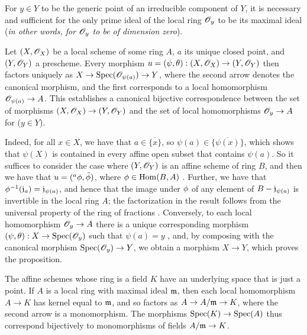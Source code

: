 \begin{cor}[2.4.3]
\label{1.2.4.3}
For $y\in Y$ to be the generic point of an irreducible component of $Y$, it is necessary and sufficient for the only prime ideal of the local ring $\mathscr{O}_y$ to be its maximal ideal (\emph{in other words, for $\mathscr{O}_y$ to be of \emph{dimension zero}}).
\end{cor}

\begin{prop}[2.4.4]
\label{1.2.4.4}
Let $(X,\mathscr{O}_X)$ be a local scheme of some ring $A$, $a$ its unique closed point, and $(Y,\mathscr{O}_Y)$ a prescheme.
Every morphism $u=(\psi,\theta):(X,\OO_X)\to(Y,\OO_Y)$ then factors uniquely as $X\to\Spec(\OO_{\psi(a)})\to Y$, where the second arrow denotes the canonical morphism, and the first corresponds to a local homomorphism $\OO_{\psi(a)}\to A$.
This establishes a canonical bijective correspondence between the set of morphisms $(X,\OO_X)\to(Y,\OO_Y)$ and the set of local homomorphisms $\OO_y\to A$ for ($y\in Y$).
\end{prop}

Indeed, for all $x\in X$, we have that $a\in\overline{\{x\}}$, so $\psi(a)\in\overline{\{\psi(x)\}}$, which shows that $\psi(X)$ is contained in every affine open subset that contains $\psi(a)$.
So it suffices to consider the case where $(Y,\mathscr{O}_Y)$ is an affine scheme of ring $B$, and then we have that $u=({}^a\phi,\tilde{\phi})$, where $\phi\in{\mathop{\mathrm{Hom}}\nolimits}(B,A)$ .
Further, we have that $\phi^{-1}(\mathfrak{j}_a)=\mathfrak{j}_{\psi(a)}$, and hence that the image under $\phi$ of any element of $B-\mathfrak{j}_{\psi(a)}$ is invertible in the local ring $A$;
the factorization in the result follows from the universal property of the ring of fractions .
Conversely, to each local homomorphism $\OO_y\to A$ there is a unique corresponding morphism $(\psi,\theta):X\to\Spec(\OO_y)$ such that $\psi(a)=y$ , and, by composing with the canonical morphism $\Spec(\OO_y)\to Y$, we obtain a morphism $X\to Y$, which proves the proposition.

\begin{env}[2.4.5]
\label{1.2.4.5}
The affine schemes whose ring is a field $K$ have an underlying space that is just a point.
If $A$ is a local ring with maximal ideal $\mathfrak{m}$, then each local homomorphism $A\to K$ has kernel equal to $\mathfrak{m}$, and so factors as $A\to A/\fk{m}\to K$, where the second arrow is a monomorphism.
The morphisms $\Spec(K)\to\Spec(A)$ thus correspond bijectively to monomorphisms of fields $A/\fk{m}\to K$.
\end{env}

